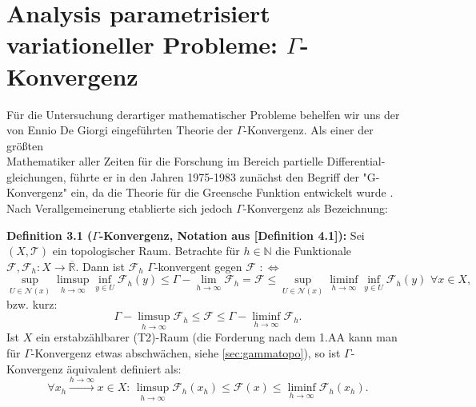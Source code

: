 \section[Analysis parametrisiert variationeller Probleme: Gamma-Konvergenz]{Analysis parametrisiert variationeller Probleme: \(\Gamma\)-Konvergenz}{\label{sec:anagamma}}
Für die Untersuchung derartiger mathematischer Probleme behelfen wir uns der von Ennio De Giorgi eingeführten Theorie der \(\Gamma\)-Konvergenz. Als einer der größten\\ Mathematiker aller Zeiten für die Forschung im Bereich partielle Differential-\\gleichungen, führte er in den Jahren 1975-1983 zunächst den Begriff der "G-Konvergenz" ein, da die Theorie für die Greensche Funktion entwickelt wurde \cite{BioDeGiorgi}. Nach Verallgemeinerung etablierte sich jedoch \(\Gamma\)-Konvergenz als Bezeichnung:\\[0.5cm]
\colorbox{generalYellow}{\begin{minipage}{16cm}{\textcolor{black}{}{\label{def3.1}}}
\textbf{Definition 3.1 (\(\Gamma\)-Konvergenz, Notation aus \cite{MasoGamma}[Definition 4.1]):} Sei \((X,\mathcal{T})\) ein topologischer Raum. Betrachte für \(h \in \mathbb{N}\) die Funktionale \(\mathcal{F},\mathcal{F}_h: X \to \overline{\mathbb{R}}\). Dann ist \(\mathcal{F}_h\) \(\Gamma\)-konvergent gegen \(\mathcal{F}\) \(:\Leftrightarrow\)
\begin{equation}
    \sup_{U \in \mathcal{N}(x)} \limsup_{h \to \infty} \inf_{y \in U} \mathcal{F}_h(y) \leq \Gamma-\lim_{h \to \infty} \mathcal{F}_h = \mathcal{F} \leq \sup_{U \in \mathcal{N}(x)} \liminf_{h \to \infty} \inf_{y \in U} \mathcal{F}_h(y)\,\, \forall x \in X,
\end{equation}
bzw. kurz:
\begin{equation}
    \Gamma-\limsup_{h \to \infty} \mathcal{F}_h \leq \mathcal{F} \leq \Gamma-\liminf_{h \to \infty} \mathcal{F}_h.
\end{equation}
Ist \(X\) ein erstabzählbarer (T2)-Raum (die Forderung nach dem 1.AA kann man für \(\Gamma\)-Konvergenz etwas abschwächen, siehe \ref{sec:gammatopo}), so ist \(\Gamma\)-Konvergenz äquivalent definiert als:
\begin{equation}
    \forall x_h \stackrel{h \to \infty}{\to} x \in X: \, \limsup_{h \to \infty} \mathcal{F}_h (x_h) \leq \mathcal{F}(x) \leq \liminf_{h \to \infty} \mathcal{F}_h (x_h).
\end{equation}
\end{minipage}}\\

